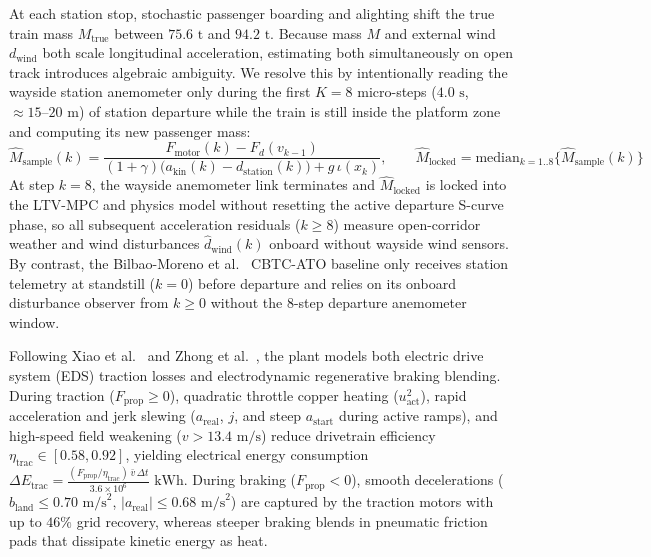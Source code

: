 \documentclass[10pt,a4paper]{article}
\begin{document}
At each station stop, stochastic passenger boarding and alighting shift the true train mass $M_{\text{true}}$ between $75.6\text{ t}$ and $94.2\text{ t}$. Because mass $M$ and external wind $d_{\text{wind}}$ both scale longitudinal acceleration, estimating both simultaneously on open track introduces algebraic ambiguity. We resolve this by intentionally reading the wayside station anemometer only during the first $K = 8$ micro-steps ($4.0\text{ s}$, $\approx 15\text{--}20\text{ m}$) of station departure while the train is still inside the platform zone and computing its new passenger mass:
\begin{equation}
    \hat{M}_{\text{sample}}(k) = \frac{F_{\text{motor}}(k) - F_d(v_{k-1})}{(1 + \gamma)\big(a_{\text{kin}}(k) - d_{\text{station}}(k)\big) + g\,\iota(x_k)}, \qquad
    \hat{M}_{\text{locked}} = \text{median}_{k=1..8}\big\{\hat{M}_{\text{sample}}(k)\big\}
    \label{eq:mass_id}
\end{equation}
At step $k = 8$, the wayside anemometer link terminates and $\hat{M}_{\text{locked}}$ is locked into the LTV-MPC and physics model without resetting the active departure S-curve phase, so all subsequent acceleration residuals ($k \ge 8$) measure open-corridor weather and wind disturbances $\hat{d}_{\text{wind}}(k)$ onboard without wayside wind sensors. By contrast, the Bilbao-Moreno et al.\ \cite{bilbao2025} CBTC-ATO baseline only receives station telemetry at standstill ($k = 0$) before departure and relies on its onboard disturbance observer from $k \ge 0$ without the 8-step departure anemometer window.

Following Xiao et al.\ \cite{xiao2023} and Zhong et al.\ \cite{zhong2022}, the plant models both electric drive system (EDS) traction losses and electrodynamic regenerative braking blending. During traction ($F_{\text{prop}} \ge 0$), quadratic throttle copper heating ($u_{\text{act}}^2$), rapid acceleration and jerk slewing ($a_{\text{real}}$, $j$, and steep $a_{\text{start}}$ during active ramps), and high-speed field weakening ($v > 13.4\text{ m/s}$) reduce drivetrain efficiency $\eta_{\text{trac}} \in [0.58, 0.92]$, yielding electrical energy consumption $\Delta E_{\text{trac}} = \frac{(F_{\text{prop}} / \eta_{\text{trac}})\,\bar{v}\,\Delta t}{3.6 \times 10^6}\text{ kWh}$. During braking ($F_{\text{prop}} < 0$), smooth decelerations ($b_{\text{land}} \le 0.70\text{ m/s}^2$, $|a_{\text{real}}| \le 0.68\text{ m/s}^2$) are captured by the traction motors with up to $46\%$ grid recovery, whereas steeper braking blends in pneumatic friction pads that dissipate kinetic energy as heat.
\end{document}
